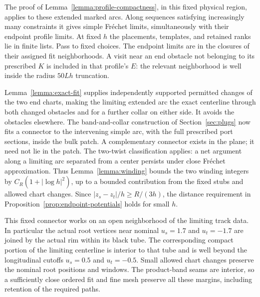 The proof of Lemma~\ref{lemma:profile-compactness}, in this fixed
physical region, applies to these extended marked arcs.  Along
sequences satisfying increasingly many constraints it gives simple
Fr\'echet limits, simultaneously with their endpoint profile limits.
At fixed $h$ the placements, templates, and retained ranks lie in
finite lists.  Pass to fixed choices.  The endpoint limits are in the
closures of their assigned fit neighborhoods.  A visit near an end
obstacle not belonging to its prescribed $K$ is included in that
profile's $E$: the relevant neighborhood is well inside the radius
$50Lh$ truncation.

Lemma~\ref{lemma:exact-fit} supplies independently supported permitted
changes of the two end charts, making the limiting extended arc the
exact centerline through both changed obstacles and for a further
collar on either side.  It avoids the obstacles elsewhere.  The
band-and-collar construction of Section~\ref{sec:plugs} now fits a
connector to the intervening simple arc, with the full prescribed
port sections, inside the bulk patch.  A complementary connector
exists in the plane; it need not lie in the patch.  The two-twist
classification applies: a net argument along a limiting arc separated
from a center persists under close Fr\'echet approximation.  Thus
Lemma~\ref{lemma:winding} bounds the two winding integers by
$C_R(1+|\log h|^2)$, up to a bounded contribution from the fixed stubs
and allowed chart changes.  Since $|z_s-z_t|/h\ge R/(3h)$, the
distance requirement in Proposition~\ref{prop:endpoint-potentials}
holds for small $h$.

This fixed connector works on an open neighborhood of the limiting
track data.  In particular the actual root vertices near nominal
$u_s=1.7$ and $u_t=-1.7$ are joined by the actual rim within its
black tube.  The corresponding compact portion of the limiting
centerline is interior to that tube and is well beyond the
longitudinal cutoffs $u_s=0.5$ and $u_t=-0.5$.  Small allowed chart
changes preserve the nominal root positions and windows.  The
product-band seams are interior, so a sufficiently close ordered fit
and fine mesh preserve all these margins, including retention of the
required paths.

